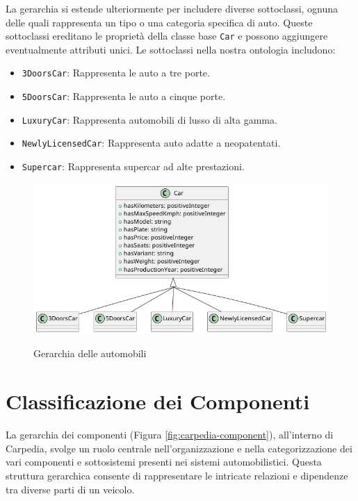 La gerarchia si estende ulteriormente per includere diverse sottoclassi, ognuna delle quali rappresenta un tipo o una categoria specifica di auto. Queste sottoclassi ereditano le proprietà della classe base \texttt{Car} e possono aggiungere eventualmente attributi unici. Le sottoclassi nella nostra ontologia includono:

\begin{itemize}
    \item \texttt{3DoorsCar}: Rappresenta le auto a tre porte.
    \item \texttt{5DoorsCar}: Rappresenta le auto a cinque porte.
    \item \texttt{LuxuryCar}: Rappresenta automobili di lusso di alta gamma.
    \item \texttt{NewlyLicensedCar}: Rappresenta auto adatte a neopatentati.
    \item \texttt{Supercar}: Rappresenta supercar ad alte prestazioni.
\end{itemize}

\begin{figure}[H]
    \caption{Gerarchia delle automobili}
    \includegraphics[width=\textwidth]{figures/carpedia-car.png}
    \label{fig:carpedia-car}
\end{figure}

\section{Classificazione dei Componenti}

La gerarchia dei componenti (Figura \ref{fig:carpedia-component}), all'interno di Carpedia, svolge un ruolo centrale nell'organizzazione e nella categorizzazione dei vari componenti e sottosistemi presenti nei sistemi automobilistici. Questa struttura gerarchica consente di rappresentare le intricate relazioni e dipendenze tra diverse parti di un veicolo.

